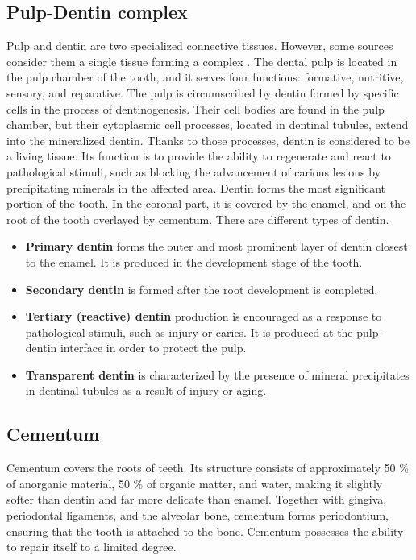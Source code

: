 \subsection*{Pulp-Dentin complex}
Pulp and dentin are two specialized connective tissues. However, some sources consider them a single tissue forming a complex \cite{2019a}.
The dental pulp is located in the pulp chamber of the tooth, and it serves four functions: formative, nutritive, sensory, and reparative.
The pulp is circumscribed by dentin formed by specific cells in the process of dentinogenesis. Their cell bodies are found in the pulp chamber, but their cytoplasmic cell processes, located in dentinal tubules, extend into the mineralized dentin. Thanks to those processes, dentin is considered to be a living tissue. Its function is to provide the ability to regenerate and react to pathological stimuli, such as blocking the advancement of carious lesions by precipitating minerals in the affected area.
Dentin forms the most significant portion of the tooth. In the coronal part, it is covered by the enamel, and on the root of the tooth overlayed by cementum. There are different types of dentin.
\begin{itemize}
    \item \textbf{Primary dentin} forms the outer and most prominent layer of dentin closest to the enamel. It is produced in the development stage of the tooth.
    \item \textbf {Secondary dentin} is formed after the root development is completed.
    \item \textbf{Tertiary (reactive) dentin} production is encouraged as a response to pathological stimuli, such as injury or caries. It is produced at the pulp-dentin interface in order to protect the pulp.
    \item \textbf{Transparent dentin} is characterized by the presence of mineral precipitates in dentinal tubules as a result of injury or aging.
\end{itemize}


\subsection*{Cementum}
Cementum covers the roots of teeth. Its structure consists of approximately 50 \% of anorganic material, 50 \% of organic matter, and water, making it slightly softer than dentin and far more delicate than enamel. Together with gingiva, periodontal ligaments, and the alveolar bone, cementum forms periodontium, ensuring that the tooth is attached to the bone. Cementum possesses the ability to repair itself to a limited degree.

